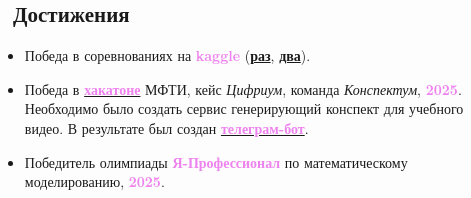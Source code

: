 \documentclass[a4paper,12pt]{article}
\begin{document}
	\subsection*{\faTrophy\ Достижения}
	\begin{itemize}
		\item Победа в соревнованиях на \textcolor{violet}{\textbf{kaggle}} (\href{https://www.kaggle.com/competitions/fall-ml-4-mipt-2025/leaderboard}{\textbf{раз}}, \href{https://www.kaggle.com/competitions/fall-ml-6-mipt-2025/leaderboard}{\textbf{два}}).
		\item Победа в \href{https://www.figma.com/board/JqewkyeKxGNv3K8oA2SAdw}{\textcolor{violet}{\textbf{хакатоне}}} МФТИ, кейс \textit{Цифриум}, команда \textit{Конспектум}, \textcolor{violet}{\textbf{2025}}. \\
		Необходимо было создать сервис генерирующий конспект для учебного видео. В результате был создан \href{https://github.com/petrovortex/konspektum}{\textcolor{violet}{\textbf{телеграм-бот}}}. 
		
		\item Победитель олимпиады \textcolor{violet}{\textbf{Я-Профессионал}} по математическому моделированию, \textcolor{violet}{\textbf{2025}}.
	\end{itemize}
	
	\newpage
\end{document}

